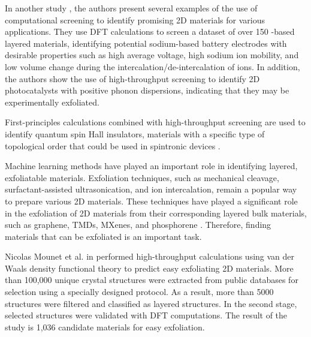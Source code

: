 In another study \cite{zhang2018effective}, the authors present several examples of the use of computational screening to identify promising 2D materials for various applications. They use DFT calculations to screen a dataset of over 150 -based layered materials, identifying potential sodium-based battery electrodes with desirable properties such as high average voltage, high sodium ion mobility, and low volume change during the intercalation/de-intercalation of  ions. In addition, the authors show the use of high-throughput screening to identify 2D photocatalysts with positive phonon dispersions, indicating that they may be experimentally exfoliated.

First-principles calculations combined with high-throughput screening are used to identify quantum spin Hall insulators, materials with a specific type of topological order that could be used in spintronic devices \cite{mounet2018two,Olsen2016Designing, Padilha2016new, Xu2013Large, Yu2017Strain, Zhang2017Correction}.


Machine learning methods have played an important role in identifying layered, exfoliatable materials. Exfoliation techniques,  such as mechanical cleavage, surfactant-assisted ultrasonication, and ion intercalation, remain a popular way to prepare various 2D materials. These techniques have played a significant role in the exfoliation of 2D materials from their corresponding layered bulk materials, such as graphene, TMDs, MXenes, and phosphorene \cite{novoselovElectricFieldEffect2004, nicolosiLiquidExfoliationLayered2013,colemanTwodimensionalNanosheetsProduced2011,liBlackPhosphorusFieldeffect2014,mounetTwodimensionalMaterialsHighthroughput2018,naguib25thAnniversaryArticle2014}. Therefore, finding materials that can be exfoliated is an important task.

Nicolas Mounet et al. in \cite{mounet2018two} performed high-throughput calculations using van der Waals density functional theory to predict easy exfoliating 2D materials. More than 100,000 unique crystal structures were extracted from public databases for selection using a specially designed protocol. As a result, more than 5000 structures were filtered and classified as layered structures. In the second stage, selected structures were validated with DFT computations. The result of the study is 1,036 candidate materials for easy exfoliation.


